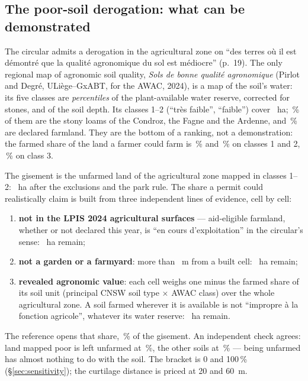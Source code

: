 \documentclass[11pt,a4paper]{article}
\begin{document}
\subsection{The poor-soil derogation: what can be demonstrated}\label{sec:soils}

The circular admits a derogation in the agricultural zone on ``des terres où il
est démontré que la qualité agronomique du sol est médiocre'' (p.~19). The only
regional map of agronomic soil quality, \emph{Sols de bonne qualité agronomique}
(Pirlot and Degré, ULiège--GxABT, for the AWAC, 2024), is a map of the soil's
water: its five classes are \emph{percentiles} of the plant-available water
reserve, corrected for stones, and of the soil depth. Its classes 1--2 (``très
faible'', ``faible'') cover \EvPoorRegionHa{}~ha; \EvPoorStonyPct{}\,\% of them
are the stony loams of the Condroz, the Fagne and the Ardenne, and
\EvPoorFarmedPct{}\,\% are declared farmland. They are the bottom of a ranking,
not a demonstration: the farmed share of the land a farmer could farm is
\EvFarmedClassOne{}\,\% and \EvFarmedClassTwo{}\,\% on classes 1 and 2,
\EvFarmedClassThree{}\,\% on class 3.

The gisement is the unfarmed land of the agricultural zone mapped in classes 1--2:
\EvMappedPoorHa{}~ha after the exclusions and the park rule. The share a permit
could realistically claim is built from three independent lines of evidence,
cell by cell:
\begin{enumerate}
\item \textbf{not in the LPIS 2024 agricultural surfaces} --- aid-eligible
  farmland, whether or not declared this year, is ``en cours d'exploitation'' in
  the circular's sense: \EvNotLpisHa{}~ha remain;
\item \textbf{not a garden or a farmyard}: more than \EvCurtilage{}~m from a
  built cell: \EvNotCurtilageHa{}~ha remain;
\item \textbf{revealed agronomic value}: each cell weighs one minus the farmed
  share of its soil unit (principal CNSW soil type $\times$ AWAC class) over the
  whole agricultural zone. A soil farmed wherever it is available is not
  ``impropre à la fonction agricole'', whatever its water reserve:
  \EvRevealedWeightedHa{}~ha remain.
\end{enumerate}
The reference opens that share, \EvShare{}\,\% of the gisement. An independent
check agrees: land mapped poor is left unfarmed at \EvUnfarmedPoor{}\,\%,
the other soils at \EvUnfarmedOther{}\,\% --- being unfarmed has almost nothing
to do with the soil. The bracket is 0 and 100\,\% (\S{}\ref{sec:sensitivity});
the curtilage distance is priced at 20 and 60~m.
\end{document}

